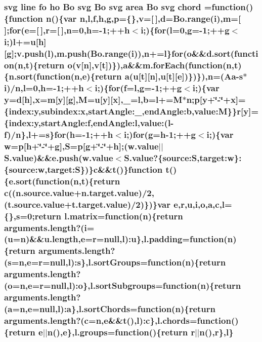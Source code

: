 \subsubsection[{chord}]{ {\bf svg} {\bf line} {\bf fo} {\bf ho} {\bf Bo} {\bf svg} {\bf Bo} {\bf svg} {\bf area} {\bf Bo} {\bf svg} chord =function()\{function {\bf n}()\{var {\bf n},l,{\bf f},h,g,p=\{\},v=[$\,$],{\bf d}={\bf Bo.\+range}({\bf i}),m=[$\,$];{\bf for}({\bf e}=[$\,$],{\bf r}=[$\,$],{\bf n}=0,h=-\/1;++h$<${\bf i};)\{{\bf for}(l=0,g=-\/1;++g$<${\bf i};)l+=u[h][g];v.\+push(l),m.\+push({\bf Bo.\+range}({\bf i})),{\bf n}+=l\}{\bf for}({\bf o}\&\&{\bf d.\+sort}(function({\bf n},t)\{{\bf return} {\bf o}(v[{\bf n}],v[t])\}),{\bf a}\&\&{\bf m.\+for\+Each}(function({\bf n},t)\{{\bf n.\+sort}(function({\bf n},{\bf e})\{{\bf return} {\bf a}(u[t][{\bf n}],u[t][{\bf e}])\})\}),{\bf n}=({\bf Aa}-\/s$\ast${\bf i})/{\bf n},l=0,h=-\/1;++h$<${\bf i};)\{{\bf for}({\bf f}=l,g=-\/1;++g$<${\bf i};)\{var y={\bf d}[h],{\bf x}=m[y][g],M=u[y][{\bf x}],\+\_\+=l,{\bf b}=l+=M$\ast${\bf n};p[y+\char`\"{}-\/\char`\"{}+{\bf x}]=\{index\+:y,subindex\+:x,start\+Angle\+:\+\_\+,end\+Angle\+:b,value\+:\+M\}\}{\bf r}[y]=\{index\+:y,start\+Angle\+:f,end\+Angle\+:l,value\+:(l-\/{\bf f})/{\bf n}\},l+=s\}{\bf for}(h=-\/1;++h$<${\bf i};){\bf for}(g=h-\/1;++g$<${\bf i};)\{var w=p[h+\char`\"{}-\/\char`\"{}+g],S=p[g+\char`\"{}-\/\char`\"{}+h];(w.\+value$\vert$$\vert$S.\+value)\&\&e.\+push(w.\+value$<$S.\+value?\{source\+:\+S,target\+:w\}\+:\{source\+:w,target\+:\+S\})\}{\bf c}\&\&t()\}function t()\{{\bf e.\+sort}(function({\bf n},t)\{{\bf return} {\bf c}((n.\+source.\+value+n.\+target.\+value)/2,(t.\+source.\+value+t.\+target.\+value)/2)\})\}var {\bf e},{\bf r},u,{\bf i},{\bf o},{\bf a},{\bf c},l=\{\},s=0;{\bf return} l.\+matrix=function({\bf n})\{{\bf return} arguments.\+length?({\bf i}=(u={\bf n})\&\&u.\+length,{\bf e}={\bf r}=null,l)\+:u\},l.\+padding=function({\bf n})\{{\bf return} arguments.\+length?(s={\bf n},{\bf e}={\bf r}=null,l)\+:s\},l.\+sort\+Groups=function({\bf n})\{{\bf return} arguments.\+length?({\bf o}={\bf n},{\bf e}={\bf r}=null,l)\+:{\bf o}\},l.\+sort\+Subgroups=function({\bf n})\{{\bf return} arguments.\+length?({\bf a}={\bf n},{\bf e}=null,l)\+:{\bf a}\},l.\+sort\+Chords=function({\bf n})\{{\bf return} arguments.\+length?({\bf c}={\bf n},{\bf e}\&\&t(),l)\+:{\bf c}\},l.\+chords=function()\{{\bf return} {\bf e}$\vert$$\vert${\bf n}(),{\bf e}\},l.\+groups=function()\{{\bf return} {\bf r}$\vert$$\vert${\bf n}(),{\bf r}\},l\}}\label{d3_8min_8js_a704cda3dfcacbd7f1aa3b5525e3fd81d}


